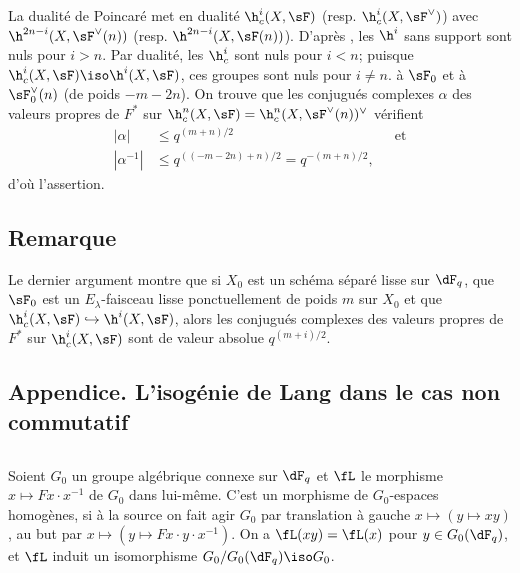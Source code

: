 La dualité de Poincaré met en dualité $\h_c^i(X,\sF)$ (resp. 
$\h_c^i(X,\sF^\vee)$) avec $\h^{2n-i}(X,\sF^\vee(n))$ (resp. 
$\h^{2n-i}(X,\sF(n))$). D'après \cite[XIV 3.2]{sga4}, les $\h^i$ sans support 
sont nuls pour $i>n$. Par dualité, les $\h_c^i$ sont nuls pour $i<n$; puisque 
$\h_c^i(X,\sF) \iso \h^i(X,\sF)$, ces groupes sont nuls pour $i\ne n$. 
 à $\sF_0$ et à $\sF_0^\vee(n)$ (de poids 
$-m-2n$). On trouve que les conjugués complexes $\alpha$ des valeurs propres 
de $F^\ast$ sur $\h_c^n(X,\sF) = \h_c^n(X,\sF^\vee(n))^\vee$ vérifient 
\begin{align*}
  |\alpha| &\leqslant q^{(m+n)/2} && \text{et} \\
  |\alpha^{-1}| &\leqslant q^{((-m-2n)+n)/2} = q^{-(m+n)/2} \text{,}
\end{align*}
d'où l'assertion. 





\subsection{Remarque}\label{VI:1-21}

Le dernier argument montre que si $X_0$ est un schéma séparé lisse sur 
$\dF_q$, que $\sF_0$ est un $E_\lambda$-faisceau lisse ponctuellement de poids 
$m$ sur $X_0$ et que $\h_c^i(X,\sF) \hookrightarrow \h^i(X,\sF)$, alors les 
conjugués complexes des valeurs propres de $F^\ast$ sur $\h_c^i(X,\sF)$ sont 
de valeur absolue $q^{(m+i)/2}$. 





\subsection*{Appendice. L'isogénie de Lang dans le cas non commutatif}




\subsection{}\label{VI:1-22}

Soient $G_0$ un groupe algébrique connexe sur $\dF_q$ et $\fL$ le morphisme 
$x\mapsto F x\cdot x^{-1}$ de $G_0$ dans lui-même. C'est un morphisme de 
$G_0$-espaces homogènes, si à la source on fait agir $G_0$ par translation 
à gauche $x\mapsto (y\mapsto x y)$, au but par 
$x\mapsto (y\mapsto F x\cdot y\cdot x^{-1})$. On a $\fL(xy) = \fL(x)$ pour 
$y\in G_0(\dF_q)$, et $\fL$ induit un isomorphisme $G_0/G_0(\dF_q)\iso G_0$. 

